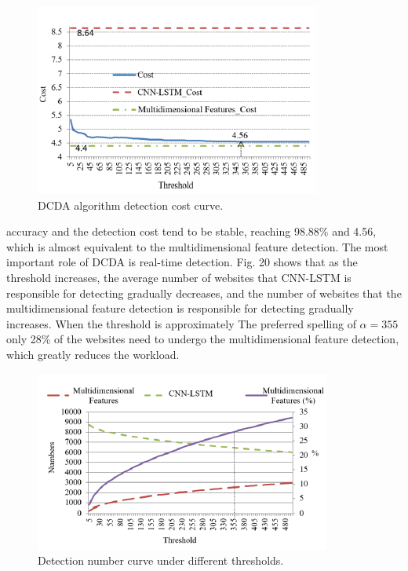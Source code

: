 \documentclass{ieeeaccess}
\begin{document}
\begin{figure}
    \centering
    \includegraphics[width=\linewidth]{figure19.png}
    \caption{DCDA algorithm detection cost curve.}
    \label{fig:19}
\end{figure}
accuracy and the detection cost tend to be stable, reaching
98.88\% and 4.56, which is almost equivalent to the multidimensional
feature detection. The most important role of DCDA is real-time detection. Fig. 20 shows that as the threshold increases, the average number of websites that
CNN-LSTM is responsible for detecting gradually decreases, and the number of websites that the multidimensional feature detection is responsible for detecting gradually increases. When the threshold is approximately The preferred spelling of
$\alpha = 355$ only 28\% of the websites need to undergo the multidimensional feature detection, which greatly reduces the workload.
\begin{figure}
    \centering
    \includegraphics[width=\linewidth]{figure20.png}
    \caption{Detection number curve under different thresholds.}
    \label{fig:20}
\end{figure}
\end{document}
